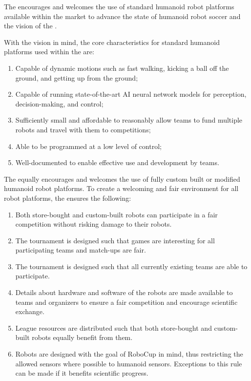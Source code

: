 The \leaguenameabbr encourages and welcomes the use of standard humanoid robot platforms available within the market to advance the state of humanoid robot soccer and the vision of the \leaguenameabbr.

With the \leaguenameabbr vision in mind, the core characteristics for standard humanoid platforms used within the \leaguenameabbr are:

\begin{enumerate}
    \item Capable of dynamic motions such as fast walking, kicking a ball off the ground, and getting up from the ground;
    \item Capable of running state-of-the-art AI neural network models for perception, decision-making, and control;
    \item Sufficiently small and affordable to reasonably allow teams to fund multiple robots and travel with them to competitions;
    \item Able to be programmed at a low level of control;
    \item Well-documented to enable effective use and development by teams.
\end{enumerate}


The \leaguenameabbr equally encourages and welcomes the use of fully custom built or modified humanoid robot platforms. To create a welcoming and fair environment for all robot platforms, the \leaguenameabbr ensures the following:
\begin{enumerate}
	\item Both store-bought and custom-built robots can participate in a fair competition without risking damage to their robots.
	\item The tournament is designed such that games are interesting for all participating teams and match-ups are fair.
	\item The tournament is designed such that all currently existing teams are able to participate.
	\item Details about hardware and software of the robots are made available to teams and organizers to ensure a fair competition and encourage scientific exchange.
	\item League resources are distributed such that both store-bought and custom-built robots equally benefit from them.
	\item Robots are designed with the goal of RoboCup in mind, thus restricting the allowed sensors where possible to humanoid sensors. Exceptions to this rule can be made if it benefits scientific progress.
\end{enumerate}
